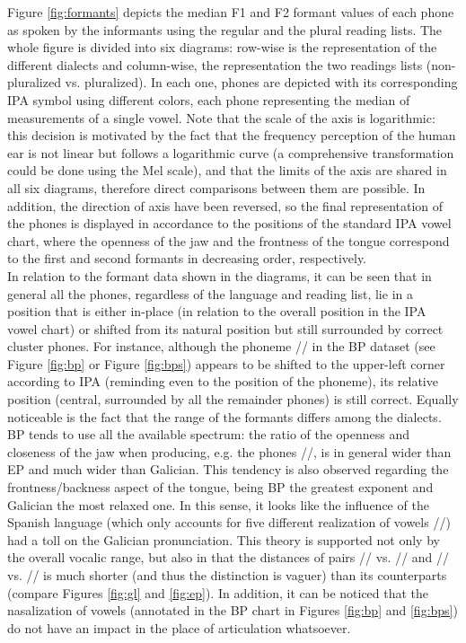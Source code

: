\documentclass[a4paper,11pt]{article}
\begin{document}
Figure \ref{fig:formants} depicts the median F1 and F2 formant values of each phone as spoken by the informants using the regular and the plural reading lists. The whole figure is divided into six diagrams: row-wise is the representation of the different dialects and column-wise, the representation the two readings lists (non-pluralized vs. pluralized). In each one, phones are depicted with its corresponding IPA symbol using different colors, each phone representing the median of measurements of a single vowel. Note that the scale of the axis is logarithmic: this decision is motivated by the fact that the frequency perception of the human ear is not linear but follows a logarithmic curve (a comprehensive transformation could be done using the Mel scale), and that the limits of the axis are shared in all six diagrams, therefore direct comparisons between them are possible. In addition, the direction of axis have been reversed, so the final representation of the phones is displayed in accordance to the positions of the standard IPA vowel chart, where the openness of the jaw and the frontness of the tongue correspond to the first and second formants in decreasing order, respectively.\\

In relation to the formant data shown in the diagrams, it can be seen that in general all the phones, regardless of the language and reading list, lie in a position that is either in-place (in relation to the overall position in the IPA vowel chart) or shifted from its natural position but still surrounded by correct cluster phones. For instance, although the phoneme // in the BP dataset (see Figure \ref{fig:bp} or Figure \ref{fig:bps}) appears to be shifted to the upper-left corner according to IPA (reminding even to the position of the  phoneme), its relative position (central, surrounded by all the remainder phones) is still correct. Equally noticeable is the fact that the range of the formants differs among the dialects. BP tends to use all the available spectrum:  the ratio of the openness and closeness of the jaw when producing, e.g. the phones //, is in general wider than EP and much wider than Galician. This tendency is also observed regarding the frontness/backness aspect of the tongue, being BP the greatest exponent and Galician the most relaxed one. In this sense, it looks like the influence of the Spanish language (which only accounts for five different realization of vowels //) had a toll on the Galician pronunciation. This theory is supported not only by the overall vocalic range, but also in that the distances of pairs // vs. // and // vs. // is much shorter (and thus the distinction is vaguer) than its counterparts (compare Figures \ref{fig:gl} and \ref{fig:ep}). In addition, it can be noticed that the nasalization of vowels (annotated in the BP chart in Figures \ref{fig:bp} and \ref{fig:bps}) do not have an impact in the place of articulation whatsoever. \\
\end{document}
